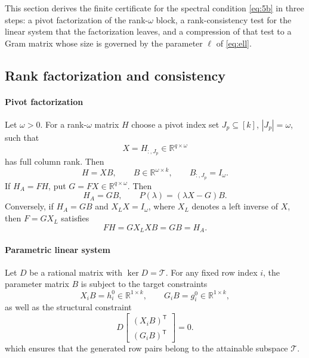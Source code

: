 \documentclass[journal]{IEEEtran}
\theoremstyle{plainn}
\theoremstyle{remark}
\begin{document}
This section derives the finite certificate for the spectral condition
\eqref{eq:5b} in three steps: a pivot factorization of the rank-$\omega$
block, a rank-consistency test for the linear system that the factorization
leaves, and a compression of that test to a Gram matrix whose size is
governed by the parameter $\ell$ of \eqref{eq:ell}.

\subsection{Rank factorization and consistency}\label{sec:consistency}

\paragraph*{Pivot factorization}\label{sec:pivot}
Let $\omega>0$. For a rank-$\omega$ matrix $H$ choose a pivot index set
$J_{p}\subseteq[k]$, $|J_{p}|=\omega$, such that
\begin{equation*}
X=H_{:,J_{p}}\in\mathbb R^{q\times\omega}
\end{equation*}
has full column rank. Then
\begin{equation*}
H=XB,\qquad B\in\mathbb R^{\omega\times k},\qquad B_{:,J_p}=I_\omega .
\end{equation*}
If $H_A=FH$, put $G=FX\in\mathbb R^{q\times\omega}$.
Then
\begin{equation*}
H_A=GB,\qquad P(\lambda)=(\lambda X-G)B .
\end{equation*}
Conversely, if $H_A=GB$ and $X_LX=I_\omega$, where $X_L$ denotes a left
inverse of $X$, then $F=GX_L$ satisfies
\begin{equation*}
FH=GX_LXB=GB=H_A .
\end{equation*}

\paragraph*{Parametric linear system}\label{sec:param}
Let $D$ be a rational matrix with $\ker D=\mathcal T$. For any fixed row index 
$i$, the parameter matrix $B$ is subject to the target constraints
\begin{equation*}
X_iB=h_i^0\in\mathbb R^{1\times k},\qquad G_iB=g_i^0\in\mathbb R^{1\times k},
\end{equation*}
as well as the structural constraint
\begin{equation*}
D\begin{bmatrix}(X_iB)^{\mathsf T}\\ (G_iB)^{\mathsf T}\end{bmatrix}=0.
\end{equation*}
which ensures that the generated row pairs belong to the attainable subspace $\mathcal T$.
\end{document}
